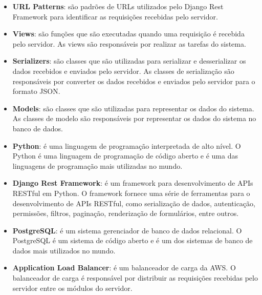\begin{itemize}
    \item \textbf{URL Patterns}: são padrões de URLs utilizados pelo Django Rest Framework para identificar as requisições recebidas pelo servidor.
    \item \textbf{Views}: são funções que são executadas quando uma requisição é recebida pelo servidor. As views são responsáveis por realizar as tarefas do sistema.
    \item \textbf{Serializers}: são classes que são utilizadas para serializar e desserializar os dados recebidos e enviados pelo servidor. As classes de serialização são responsáveis por converter os dados recebidos e enviados pelo servidor para o formato JSON.
    \item \textbf{Models}: são classes que são utilizadas para representar os dados do sistema. As classes de modelo são responsáveis por representar os dados do sistema no banco de dados.
    \item \textbf{Python}: é uma linguagem de programação interpretada de alto nível. O Python é uma linguagem de programação de código aberto e é uma das linguagens de programação mais utilizadas no mundo.
    \item \textbf{Django Rest Framework}: é um framework para desenvolvimento de APIs RESTful em Python. O framework fornece uma série de ferramentas para o desenvolvimento de APIs RESTful, como serialização de dados, autenticação, permissões, filtros, paginação, renderização de formulários, entre outros.
    \item \textbf{PostgreSQL}: é um sistema gerenciador de banco de dados relacional. O PostgreSQL é um sistema de código aberto e é um dos sistemas de banco de dados mais utilizados no mundo.
    \item \textbf{Application Load Balancer}: é um balanceador de carga da AWS. O balanceador de carga é responsável por distribuir as requisições recebidas pelo servidor entre os módulos do servidor.
\end{itemize}

